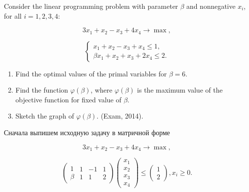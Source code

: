 \begin{problem}
Consider the linear programming problem with parameter $\beta $ and nonnegative $x_{i} $, for all $i=1, 2, 3, 4$:

\[3x_{1} +x_{2} -x_{3} +4x_{4} \to \max ,\]

\[
\begin{cases}
x_{1} +x_{2} -x_{3} +x_{4} \le 1, \\
\beta x_{1} +x_{2} +x_{3} +2x_{4} \le 2.
\end{cases}
\]

\begin{enumerate}
\item  Find the optimal values of the primal variables for $\beta =6$.

\item  Find the function $\varphi (\beta )$, where $\varphi (\beta )$ is the maximum value of the objective function for fixed value of $\beta $.

\item  Sketch the graph of $\varphi (\beta )$.  (Exam, 2014).
\end{enumerate}



\begin{sol}
Сначала выпишем исходную задачу в матричной форме


\[3x_{1} +x_{2} -x_{3} +4x_{4} \to \max ,\]

\[\left(\begin{array}{c} {1} \\ {\beta } \end{array}\begin{array}{c} {1} \\ {1} \end{array}\begin{array}{c} {-1} \\ {1} \end{array}\begin{array}{c} {1} \\ {2} \end{array}\right)\left(\begin{array}{c} {x_{1} } \\ {x_{2} } \\ {x_{3} } \\ {x_{4} } \end{array}\right)\le \left(\begin{array}{c} {1} \\ {2} \end{array}\right), x_{i} \ge 0.\]


\end{sol}
\end{problem}
